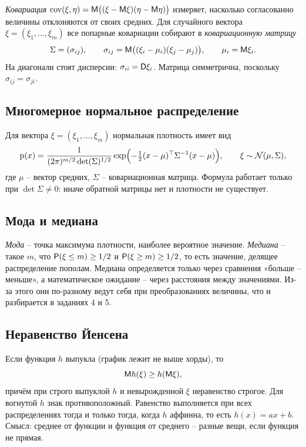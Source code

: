 \documentclass[12pt,a4paper]{article}
\begin{document}
\emph{Ковариация} $\mathrm{cov}(\xi,\eta) = \mathsf{M}\bigl((\xi - \mathsf{M}\xi)(\eta - \mathsf{M}\eta)\bigr)$
измеряет, насколько согласованно величины отклоняются от своих средних. Для
случайного вектора $\xi = (\xi_1,\dots,\xi_m)$ все попарные ковариации собирают
в \emph{ковариационную матрицу}
\[
  \Sigma = (\sigma_{ij}), \qquad
  \sigma_{ij} = \mathsf{M}\bigl((\xi_i - \mu_i)(\xi_j - \mu_j)\bigr),
  \qquad \mu_i = \mathsf{M}\xi_i .
\]
На диагонали стоят дисперсии: $\sigma_{ii} = \mathsf{D}\xi_i$. Матрица симметрична,
поскольку $\sigma_{ij} = \sigma_{ji}$.

\subsection{Многомерное нормальное распределение}

Для вектора $\xi = (\xi_1,\dots,\xi_m)$ нормальная плотность имеет вид
\begin{equation}\label{eq:mvn}
  \mathrm{p}(x) = \frac{1}{(2\pi)^{m/2}\det(\Sigma)^{1/2}}
  \exp\Bigl(-\tfrac12 (x-\mu)^{\top}\Sigma^{-1}(x-\mu)\Bigr),
  \qquad \xi \sim \mathcal{N}(\mu, \Sigma),
\end{equation}
где $\mu$ -- вектор средних, $\Sigma$ -- ковариационная матрица. Формула
работает только при $\det\Sigma \ne 0$: иначе обратной матрицы нет и плотности
не существует.

\subsection{Мода и медиана}

\emph{Мода} -- точка максимума плотности, наиболее вероятное значение.
\emph{Медиана} -- такое $m$, что $\mathsf{P}(\xi \le m) \ge 1/2$ и
$\mathsf{P}(\xi \ge m) \ge 1/2$, то есть значение, делящее распределение пополам.
Медиана определяется только через сравнения «больше -- меньше», а
математическое ожидание -- через расстояния между значениями. Из-за этого они
по-разному ведут себя при преобразованиях величины, что и разбирается
в заданиях 4 и 5.

\subsection{Неравенство Йенсена}

Если функция $h$ выпукла (график лежит не выше хорды), то
\begin{equation}\label{eq:jensen}
  \mathsf{M} h(\xi) \ge h(\mathsf{M}\xi),
\end{equation}
причём при строго выпуклой $h$ и невырожденной $\xi$ неравенство строгое. Для
вогнутой $h$ знак противоположный. Равенство выполняется при всех
распределениях тогда и только тогда, когда $h$ аффинна, то есть
$h(x) = ax + b$. Смысл: среднее от функции и функция от среднего -- разные
вещи, если функция не прямая.
\end{document}
